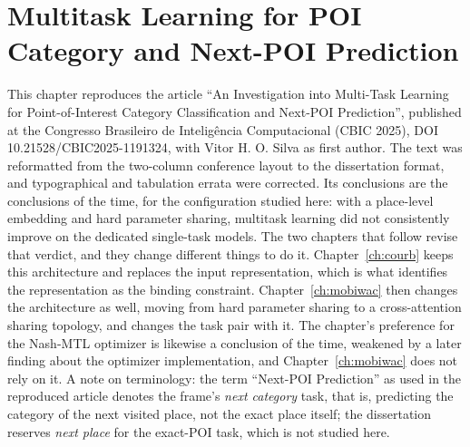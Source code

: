\chapter[Multitask Learning for POI Category and Next-POI Prediction]{Multitask Learning for POI Category and Next-POI Prediction}
\label{ch:cbic}

\begin{chapterpreface}
This chapter reproduces the article ``An Investigation into Multi-Task Learning for
Point-of-Interest Category Classification and Next-POI Prediction'', published at the
Congresso Brasileiro de Intelig\^encia Computacional (CBIC 2025), DOI
10.21528/CBIC2025-1191324, with Vitor H. O. Silva as first author. The text was
reformatted from the two-column conference layout to the dissertation format, and
typographical and tabulation errata were corrected. Its
conclusions are the conclusions of the time, for the configuration studied here: with a
place-level embedding and hard parameter sharing, multitask learning did not
consistently improve on the dedicated single-task models. The two chapters that follow
revise that verdict, and they change different things to do it.
Chapter~\ref{ch:courb} keeps this architecture and replaces the input representation,
which is what identifies the representation as the binding constraint.
Chapter~\ref{ch:mobiwac} then changes the architecture as well, moving from hard
parameter sharing to a cross-attention sharing topology, and changes the task pair with
it. The chapter's preference for the Nash-MTL optimizer is likewise
a conclusion of the time, weakened by a later finding about the optimizer
implementation, and Chapter~\ref{ch:mobiwac} does not rely on it. A note on terminology:
the term ``Next-POI Prediction'' as used in the reproduced article denotes the frame's
\emph{next category} task, that is, predicting the category of the next visited place,
not the exact place itself; the dissertation reserves \emph{next place} for the
exact-POI task, which is not studied here.
\end{chapterpreface}






